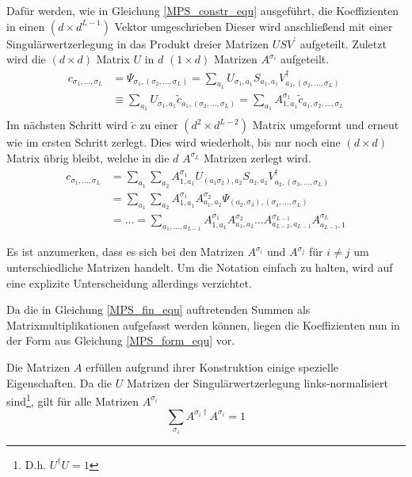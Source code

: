 \documentclass[10pt,a4paper]{report}
\newcommand{\SumIndex}{\sigma_1,\ldots,\sigma_L}
\begin{document}
Dafür werden, wie in Gleichung \ref{MPS_constr_equ} ausgeführt, die Koeffizienten in einen $(d\times d^{L-1})$ Vektor umgeschrieben Dieser wird anschließend mit einer Singulärwertzerlegung in das Produkt dreier Matrizen $USV^{\prime}$ aufgeteilt. Zuletzt wird die $(d\times d)$ Matrix $U$ in $d$ $(1\times d)$ Matrizen $A^{\sigma_i}$ aufgeteilt. 
\begin{equation}
\label{MPS_constr_equ}
\begin{split}
c_{\SumIndex}&=\Psi_{\sigma_1,(\sigma_2,\ldots,\sigma_L)} =\sum_{a_1}U_{\sigma_1,a_1}S_{a_1,a_1}V^\dagger_{a_1,(\sigma_2,\ldots,\sigma_L)} \\
&\equiv\sum_{a_1}U_{\sigma_1,a_1}\tilde{c}_{a_1,(\sigma_2,\ldots,\sigma_L)}=\sum_{a_1}A_{1,a_1}^{\sigma_1}\tilde{c}_{a_1,\sigma_2,\ldots,\sigma_L} \\
\end{split}
\end{equation}
Im nächsten Schritt wird $\tilde{c}$ zu einer $(d^2 \times d^{L-2})$ Matrix umgeformt und erneut wie im ersten Schritt zerlegt. Dies wird wiederholt, bis nur noch eine $(d\times d)$ Matrix übrig bleibt, welche in die $d$ $A^{\sigma_L}$ Matrizen zerlegt wird.
\begin{equation}
\label{MPS_fin_equ}
\begin{split}
c_{\SumIndex}&=\sum_{a_1}\sum_{a_2}A_{1,a_1}^{\sigma_1}U_{(a_1 \sigma_2),a_2}S_{a_2,a_2}V_{a_2,(\sigma_3,\ldots,\sigma_L)}^\dagger\\
&=\sum_{a_1}\sum_{a_2}A_{1,a_1}^{\sigma_1}A_{a_1,a_2}^{\sigma_2}\Psi_{(a_2,\sigma_3),(\sigma_4,\ldots,\sigma_L)}\\
&=\ldots=\sum_{a_1,\ldots,a_{L-1}}A_{1,a_1}^{\sigma_1}A_{a_1,a_2}^{\sigma_2}\ldots A_{a_{L-2},a_{L-1}}^{\sigma_{L-1}}A_{a_{L-1},1}^{\sigma_L}
\end{split}
\end{equation}

Es ist anzumerken, dass es sich bei den Matrizen $A^{\sigma_i}$ und $A^{\sigma_j}$ für $i\neq j$ um unterschiedliche Matrizen handelt. Um die Notation einfach zu halten, wird auf eine explizite Unterscheidung allerdings verzichtet.

Da die in Gleichung \ref{MPS_fin_equ} auftretenden Summen als Matrixmultiplikationen aufgefasst werden können, liegen die Koeffizienten nun in der Form aus Gleichung \ref{MPS_form_equ} vor. 

Die Matrizen $A$ erfüllen aufgrund ihrer Konstruktion einige spezielle Eigenschaften. Da die $U$ Matrizen der Singulärwertzerlegung links-normalisiert sind\footnote{D.h. $U^\dagger U=1$}, gilt für alle Matrizen $A^{\sigma_i}$
\begin{equation}
\sum_{\sigma_i}A^{\sigma_i \dagger}A^{\sigma_i}=1
\end{equation}
\end{document}

